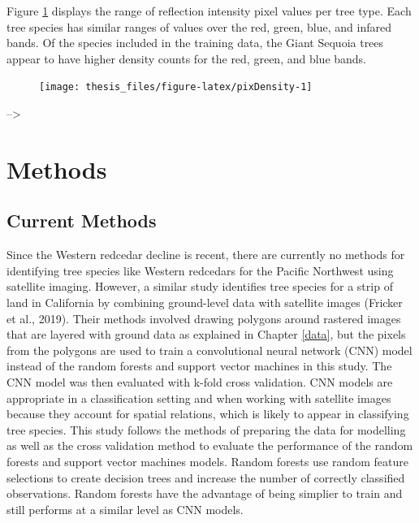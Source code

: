 \documentclass[12pt,twoside]{reedthesis}
\begin{document}
Figure \ref{fig:pixDensity} displays the range of reflection intensity pixel values per tree type. Each tree species has similar ranges of values over the red, green, blue, and infared bands. Of the species included in the training data, the Giant Sequoia trees appear to have higher density counts for the red, green, and blue bands.
\begin{figure}

{\centering \texttt{[image: thesis\_files/figure-latex/pixDensity-1]} 

}

\caption{ }\label{fig:pixDensity}
\end{figure}
--\textgreater{}

\hypertarget{methods}{%
\chapter{Methods}\label{methods}}

\hypertarget{current-methods}{%
\section{Current Methods}\label{current-methods}}

Since the Western redcedar decline is recent, there are currently no methods for identifying tree species like Western redcedars for the Pacific Northwest using satellite imaging. However, a similar study identifies tree species for a strip of land in California by combining ground-level data with satellite images (Fricker et al., 2019). Their methods involved drawing polygons around rastered images that are layered with ground data as explained in Chapter \ref{data}, but the pixels from the polygons are used to train a convolutional neural network (CNN) model instead of the random forests and support vector machines in this study. The CNN model was then evaluated with k-fold cross validation. CNN models are appropriate in a classification setting and when working with satellite images because they account for spatial relations, which is likely to appear in classifying tree species. This study follows the methods of preparing the data for modelling as well as the cross validation method to evaluate the performance of the random forests and support vector machines models. Random forests use random feature selections to create decision trees and increase the number of correctly classified observations. Random forests have the advantage of being simplier to train and still performs at a similar level as CNN models.
\end{document}
